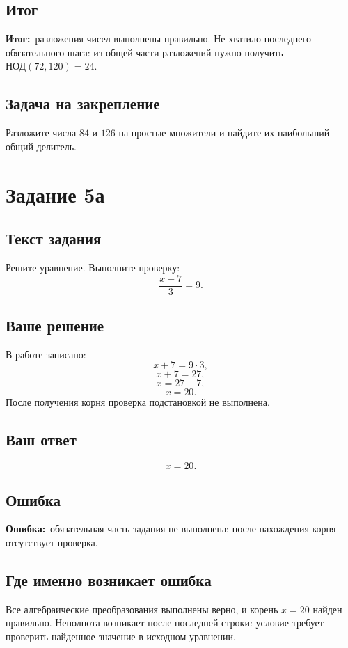 \documentclass[a4paper,12pt]{article}
\newcommand{\ErrorLabel}{\textcolor{red!75!black}{\textbf{Ошибка:}}}
\newcommand{\Outcome}{\textcolor{Result}{\textbf{Итог:}}}
\begin{document}
\subsection*{Итог}
\Outcome\ разложения чисел выполнены правильно. Не хватило последнего обязательного шага: из общей части разложений нужно получить $\text{НОД}(72,120)=24$.

\subsection*{Задача на закрепление}
Разложите числа $84$ и $126$ на простые множители и найдите их наибольший общий делитель.

\newpage
{}\label{task:5a}
\section*{Задание 5а}

\subsection*{Текст задания}
Решите уравнение. Выполните проверку:
\[
\frac{x+7}{3}=9.
\]

\subsection*{Ваше решение}
В работе записано:
\[
x+7=9\cdot3,
\]
\[
x+7=27,
\]
\[
x=27-7,
\]
\[
x=20.
\]
После получения корня проверка подстановкой не выполнена.

\subsection*{Ваш ответ}
\[
x=20.
\]

\subsection*{Ошибка}
\ErrorLabel\ обязательная часть задания не выполнена: после нахождения корня отсутствует проверка.

\subsection*{Где именно возникает ошибка}
Все алгебраические преобразования выполнены верно, и корень $x=20$ найден правильно. Неполнота возникает после последней строки: условие требует проверить найденное значение в исходном уравнении.
\end{document}
